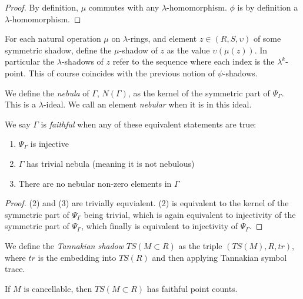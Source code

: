 \begin{proof}
  By definition, $\mu$ commutes with any $\lambda$-homomorphism. $\phi$ is by definition a $\lambda$-homomorphism. \qedhere
\end{proof}

\begin{definition}
  For each natural operation $\mu$ on $\lambda$-rings, and element $z \in (R, S, \upsilon)$ of some symmetric shadow, define the $\mu$-shadow of $z$ as the value $\upsilon(\mu(z))$. In particular the $\lambda$-shadows of $z$ refer to the sequence where each index is the $\lambda^k$-point. This of course coincides with the previous notion of $\psi$-shadows.
\end{definition}

\begin{definition}
  We define the \emph{nebula} of $\Gamma$, $N(\Gamma)$, as the kernel of the symmetric part of $\Psi_\Gamma$. This is a $\lambda$-ideal. We call an element \emph{nebular} when it is in this ideal.
\end{definition}

\begin{propdef}
  We say $\Gamma$ is \emph{faithful} when any of these equivalent statements are true:
  \begin{enumerate}
    \item $\Psi_\Gamma$ is injective
    \item $\Gamma$ has trivial nebula (meaning it is not nebulous)
    \item There are no nebular non-zero elements in $\Gamma$
  \end{enumerate}
\end{propdef}

\begin{proof}
  (2) and (3) are trivially equvialent. (2) is equivalent to the kernel of the symmetric part of $\Psi_\Gamma$ being trivial, which is again equivalent to injectivity of the symmetric part of $\Psi_\Gamma$, which finally is equivalent to injectivity of $\Psi_\Gamma$.
\end{proof}

\begin{proposition} 
\end{proposition}

\begin{proposition}
\end{proposition}


\begin{definition}
  We define the \emph{Tannakian shadow} $TS(M \subset R)$ as the triple $(TS(M), R, tr)$, where $tr$ is the embedding into $TS(R)$ and then applying Tannakian symbol trace. 
\end{definition}

\begin{proposition}
  If $M$ is cancellable, then $TS(M \subset R)$ has faithful point counts. 
\end{proposition}
